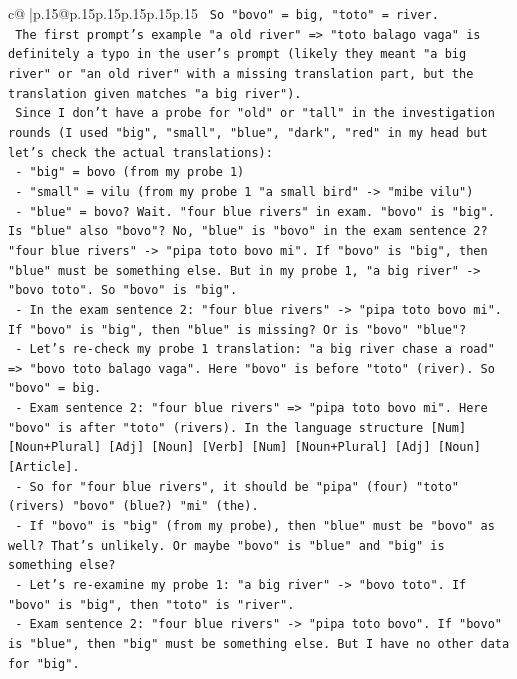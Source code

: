 \documentclass{article}
\begin{document}
{\begin{supertabular}{c@{$\;$}|p{.15\linewidth}@{}p{.15\linewidth}p{.15\linewidth}p{.15\linewidth}p{.15\linewidth}p{.15\linewidth}}
{{{\texttt{     So "bovo" = big, "toto" = river.} \\
\texttt{     The first prompt's example "a old river" => "toto balago vaga" is definitely a typo in the user's prompt (likely they meant "a big river" or "an old river" with a missing translation part, but the translation given matches "a big river").} \\
\texttt{     Since I don't have a probe for "old" or "tall" in the investigation rounds (I used "big", "small", "blue", "dark", "red" in my head but let's check the actual translations):} \\
\texttt{     {-} "big" = bovo (from my probe 1)} \\
\texttt{     {-} "small" = vilu (from my probe 1 "a small bird" {-}> "mibe vilu")} \\
\texttt{     {-} "blue" = bovo? Wait. "four blue rivers" in exam. "bovo" is "big". Is "blue" also "bovo"? No, "blue" is "bovo" in the exam sentence 2? "four blue rivers" {-}> "pipa toto bovo mi". If "bovo" is "big", then "blue" must be something else. But in my probe 1, "a big river" {-}> "bovo toto". So "bovo" is "big".} \\
\texttt{     {-} In the exam sentence 2: "four blue rivers" {-}> "pipa toto bovo mi". If "bovo" is "big", then "blue" is missing? Or is "bovo" "blue"?} \\
\texttt{     {-} Let's re{-}check my probe 1 translation: "a big river chase a road" => "bovo toto balago vaga". Here "bovo" is before "toto" (river). So "bovo" = big.} \\
\texttt{     {-} Exam sentence 2: "four blue rivers" => "pipa toto bovo mi". Here "bovo" is after "toto" (rivers). In the language structure {[}Num{]} {[}Noun+Plural{]} {[}Adj{]} {[}Noun{]} {[}Verb{]} {[}Num{]} {[}Noun+Plural{]} {[}Adj{]} {[}Noun{]} {[}Article{]}.} \\
\texttt{     {-} So for "four blue rivers", it should be "pipa" (four) "toto" (rivers) "bovo" (blue?) "mi" (the).} \\
\texttt{     {-} If "bovo" is "big" (from my probe), then "blue" must be "bovo" as well? That's unlikely. Or maybe "bovo" is "blue" and "big" is something else?} \\
\texttt{     {-} Let's re{-}examine my probe 1: "a big river" {-}> "bovo toto". If "bovo" is "big", then "toto" is "river".} \\
\texttt{     {-} Exam sentence 2: "four blue rivers" {-}> "pipa toto bovo". If "bovo" is "blue", then "big" must be something else. But I have no other data for "big".} \\
}}}
\end{supertabular}}
\end{document}

